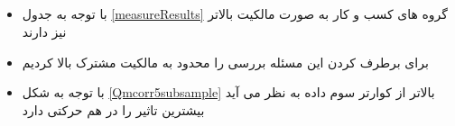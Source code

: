 \documentclass[12pt, a4paper]{article}
\begin{document}
%
\FloatBarrier



\subsection{}
\begin{itemize}
	\item 
	با توجه به جدول 
	\ref{measureResults}
	گروه های کسب و کار به صورت مالکیت بالاتر نیز دارند 
	\item
	برای برطرف کردن این مسئله بررسی را محدود به مالکیت مشترک بالا کردیم
	\item
	با توجه به شکل 
	\ref{Qmcorr5subsample}
	بالاتر از کوارتر سوم داده به نظر می آید بیشترین تاثیر را در هم حرکتی دارد
	

\end{itemize}
\end{document}
